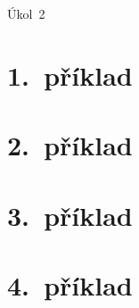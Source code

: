 \documentclass[a4paper, 11pt]{scrartcl}
\newcommand{\NUMBER}{2}
\begin{document}
    \begin{center}
        {\Large Úkol~\NUMBER}
    \end{center}


    \section*{1.~příklad}


    \section*{2.~příklad}


    \section*{3.~příklad}


    \section*{4.~příklad}
\end{document}
